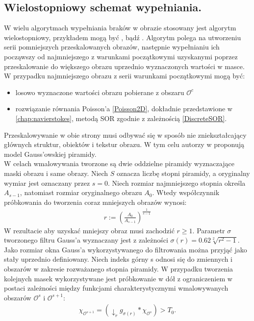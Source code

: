 \documentclass[12pt, twoside, openany]{report}
\theoremstyle{definition}
\begin{document}
\subsection{Wielostopniowy schemat wypełniania.}
W wielu algorytmach wypełniania braków w obrazie stosowany jest algorytm wielostopniowy, przykładem mogą być \cite{kawai2009image}, \cite{komodakis2007image} bądź \cite{wexler2007space}. Algorytm polega na utworzeniu serii pomniejszych przeskalowanych obrazów, następnie wypełnianiu ich począwszy od najmniejszego z warunkami początkowymi uzyskanymi poprzez przeskalowanie do większego obrazu uprzednio wyznaczonych wartości w masce. W przypadku najmniejszego obrazu z serii warunkami początkowymi mogą być:
\begin{itemize}
\item
losowo wyznaczone wartości obrazu pobierane z obszaru $\mathcal{O}^c$
\item
rozwiązanie równania Poisson'a \eqref{Poisson2D}, dokładnie przedstawione w \autoref{chap:navierstokes}, metodą SOR zgodnie z zależnością \eqref{DiscreteSOR}.
\end{itemize}
Przeskalowywanie w obie strony musi odbywać się w sposób nie zniekształcający głównych struktur, obiektów i tekstur obrazu. W tym celu autorzy w \cite{arias2011variational} proponują model Gauss'owskiej piramidy.\\
W celach wmalowywania tworzone są dwie oddzielne piramidy wyznaczające maski obrazu i same obrazy. Niech $S$ oznacza liczbę stopni piramidy, a oryginalny wymiar jest oznaczany przez $s=0$. Niech rozmiar najmniejszego stopnia określa $A_{s-1}$, natomiast rozmiar oryginalnego obrazu $A_{0}$. Wtedy współczynnik próbkowania do tworzenia coraz mniejszych obrazów wynosi:
\begin{align}
r := \left(\frac{A_0}{A_{s-1}}\right)^\frac{1}{s-1}
\end{align}
W rezultacie aby uzyskać mniejszy obraz musi zachodzić $r \geq 1$. Parametr $\sigma$ tworzonego filtru Gauss'a wyznaczany jest z zależności $\sigma(r)=0.62\sqrt[2]{r^2-1}$. Jako rozmiar okna Gauss'a wykorzystywanego do filtrowania można przyjąć jako stały uprzednio definiowany. Niech indeks górny s odnosi się do zmiennych i obszarów w zakresie rozważanego stopnia piramidy. W przypadku tworzenia kolejnych masek wykorzystywane jest próbkowanie w dół z ograniczeniem w postaci zależności między funkcjami charakterystycznymi wmalowywanych obszarów $\mathcal{O}^s$ i $\mathcal{O}^{s+1}$:
\begin{align}
\chi_{\mathcal{O}^{s+1}}=(\downarrow_rg_{\sigma(r)}\ast\chi_{\mathcal{O}^s})> T_{0}.
\end{align}
\end{document}
